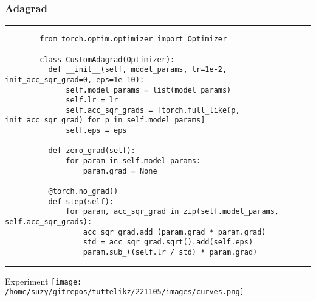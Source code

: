     \begin{frame}[fragile]
      \frametitle{Adagrad}
      \vspace{0.2cm}
      \rule{\textwidth}{1pt}
      \scriptsize
      \begin{verbatim}
        from torch.optim.optimizer import Optimizer

        class CustomAdagrad(Optimizer):
          def __init__(self, model_params, lr=1e-2, init_acc_sqr_grad=0, eps=1e-10):
              self.model_params = list(model_params)
              self.lr = lr
              self.acc_sqr_grads = [torch.full_like(p, init_acc_sqr_grad) for p in self.model_params]
              self.eps = eps

          def zero_grad(self):
              for param in self.model_params:
                  param.grad = None

          @torch.no_grad()
          def step(self):
              for param, acc_sqr_grad in zip(self.model_params, self.acc_sqr_grads):
                  acc_sqr_grad.add_(param.grad * param.grad)
                  std = acc_sqr_grad.sqrt().add(self.eps)
                  param.sub_((self.lr / std) * param.grad)
      \end{verbatim}
      \rule{\textwidth}{1pt}
    \end{frame}
    

    \begin{frame}{Experiment}
      \centering
        \texttt{[image: /home/suzy/gitrepos/tuttelikz/221105/images/curves.png]}

      \end{frame}
  
    \begin{frame}
    \printbibliography
  \end{frame} 



